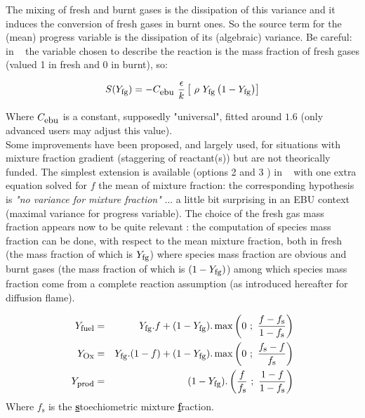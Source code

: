 The mixing of fresh and burnt gases is the dissipation of this variance and it
induces the conversion of fresh gases in burnt ones. So the source term for the
(mean) progress variable is the dissipation of its (algebraic) variance. Be
careful: in \CS~ the variable chosen to describe the reaction is the mass
fraction of fresh gases (valued 1 in fresh and 0 in burnt), so:

\begin{equation}
S(Y_{\mbox{\footnotesize fg}}) = - C_{\mbox{\small ebu}}~\frac{\epsilon}{k} \displaystyle\left[~\rho ~Y_{\mbox{\footnotesize fg}} \left(1-Y_{\mbox{\footnotesize fg}}\right)\right]
\end{equation}

Where $C_{\mbox{\small ebu}}$ is a constant, supposedly "universal", fitted
around $1.6$ (only advanced users may adjust this value).\\
Some improvements have been proposed, and largely used, for situations with
mixture fraction gradient (staggering of reactant(s)) but are not theorically
funded. The simplest extension is available (options 2 and 3 ) in \CS~ with one
extra equation solved for $f$ the mean of mixture fraction: the corresponding
hypothesis is \textit{"no variance for mixture fraction"} ... a little bit
surprising in an EBU context (maximal variance for progress variable). The
choice of the fresh gas mass fraction appears now to be quite relevant : the
computation of species mass fraction can be done, with respect to the mean
mixture fraction, both in fresh (the mass fraction of which is
$Y_{\mbox{\footnotesize fg}}$) where species mass fraction are obvious and burnt
gases (the mass fraction of which is $(1-Y_{\mbox{\footnotesize fg}})$) among
which species mass fraction come from a complete reaction assumption (as
introduced hereafter for diffusion flame).

\begin{eqnarray}
\displaystyle Y_{\mbox{\footnotesize fuel}} &=&     Y_{\mbox{\footnotesize fg}} . f + (1-Y_{\mbox{\footnotesize fg}}) . \max \left(0 ~;~\frac{f- f_{\mbox{\footnotesize s}}}{1-f_{\mbox{\footnotesize s}}}\right)       \nonumber       \\
\displaystyle Y_{\mbox{\footnotesize Ox}}   &=&     Y_{\mbox{\footnotesize fg}} . (1-f) + (1-Y_{\mbox{\footnotesize fg}}) . \max \left(   0 ~;~\frac{f_{\mbox{\footnotesize s}}-f}{f_{\mbox{\footnotesize s}}}\right)   \label{Eq_001a} \\
\displaystyle Y_{\mbox{\footnotesize prod}} &=& (1-Y_{\mbox{\footnotesize fg}}) . \left( \frac{f}{f_{\mbox{\footnotesize s}}}~;~\frac{1-f}{1-f_{\mbox{\footnotesize s}}} \right)                         \nonumber
\end{eqnarray}
Where $f_{\mbox{s}}$ is the \underline{\bf s}toechiometric mixture
\underline{\bf f}raction.

